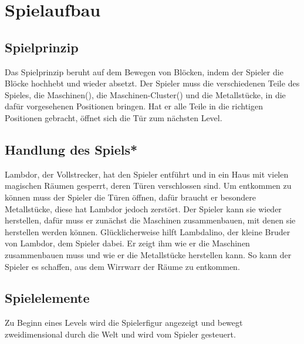 \documentclass{scrartcl}
\begin{document}

\section{Spielaufbau}

\subsection{Spielprinzip}
Das Spielprinzip beruht auf dem Bewegen von Blöcken, indem der Spieler die Blöcke hochhebt und wieder absetzt. Der Spieler muss die verschiedenen Teile des Spieles, die Maschinen(), die Maschinen-Cluster() und die Metallstücke, in die dafür vorgesehenen Positionen bringen. Hat er alle Teile in die richtigen Positionen gebracht, öffnet sich die Tür zum nächsten Level.

\subsection{Handlung des Spiels*} \label{subsection:Story}
Lambdor, der Vollstrecker, hat den Spieler entführt und in ein Haus mit vielen magischen Räumen gesperrt, deren Türen verschlossen sind. Um entkommen zu können muss der Spieler die Türen öffnen, dafür braucht er besondere Metallstücke, diese hat Lambdor jedoch zerstört. Der Spieler kann sie wieder herstellen, dafür muss er zunächst die Maschinen zusammenbauen, mit denen sie herstellen werden können. Glücklicherweise hilft Lambdalino, der kleine Bruder von Lambdor, dem Spieler dabei. Er zeigt ihm wie er die Maschinen zusammenbauen muss und wie er die Metallstücke herstellen kann. So kann der Spieler es schaffen, aus dem Wirrwarr der Räume zu entkommen.


\subsection{Spielelemente}

Zu Beginn eines Levels wird die Spielerfigur angezeigt und bewegt zweidimensional durch die Welt und wird vom Spieler gesteuert.
\end{document}
